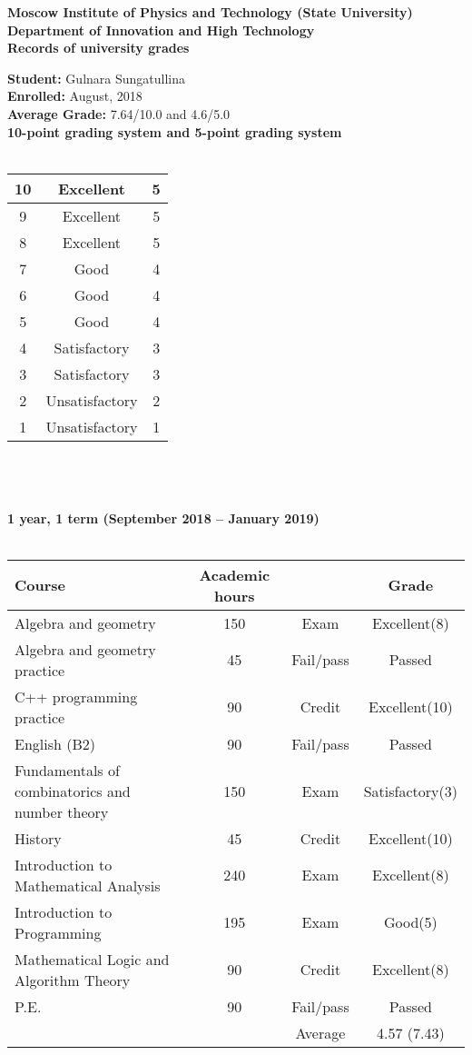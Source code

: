 \documentclass[11pt, a4paper]{report}
\title{}
\author{}
\date{}
\begin{document}
\begin{center}
\textbf{Moscow Institute of Physics and Technology (State University)\\ Department of Innovation and High Technology\\Records of university grades}
\end{center}
\textbf{Student:} Gulnara Sungatullina\\
\textbf{Enrolled:} August, 2018\\
\textbf{Average Grade:} 7.64/10.0 and 4.6/5.0\\

\textbf{10-point grading system and 5-point grading system}\\ \\
\begin{tabular}{|c|c|c|}
\hline
10&Excellent & 5\\
\hline
9&Excellent & 5\\
\hline
8&Excellent & 5\\
\hline
7&Good & 4\\
\hline
6&Good & 4\\
\hline
5&Good & 4\\
\hline
4&Satisfactory & 3\\
\hline
3&Satisfactory & 3\\
\hline
2&Unsatisfactory & 2\\
\hline
1&Unsatisfactory & 1\\
\hline
\end{tabular}
\\ \\
\\
\textbf{1 year, 1 term (September 2018 -- January 2019)}\\ \\
\begin{tabular}{|p{8cm}|c|c|c|}
\hline
\textbf{Course}&\textbf{Academic hours}& &\textbf{Grade}\\
\hline

Algebra and geometry & 150 & Exam & Excellent(8)\\
Algebra and geometry practice & 45 & Fail/pass & Passed\\
C++ programming practice & 90 & Credit & Excellent(10)\\
English (B2) & 90 & Fail/pass & Passed\\
Fundamentals of combinatorics and number theory & 150 & Exam & Satisfactory(3)\\
History & 45 & Credit & Excellent(10)\\
Introduction to Mathematical Analysis & 240 & Exam & Excellent(8)\\
Introduction to Programming & 195 & Exam & Good(5)\\
Mathematical Logic and Algorithm Theory & 90 & Credit & Excellent(8)\\
P.E. & 90 & Fail/pass & Passed\\
\hline
&& Average & 4.57 (7.43)\\
\hline
\end{tabular}
\end{document}
